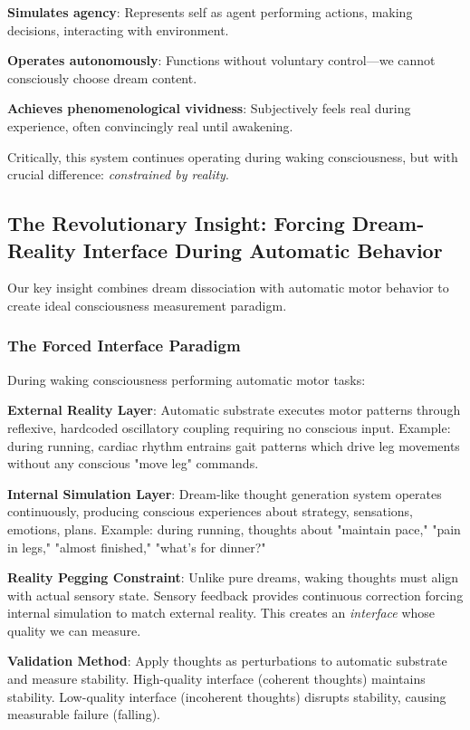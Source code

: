 \documentclass[11pt,onecolumn]{article}
\begin{document}
\textbf{Simulates agency}: Represents self as agent performing actions, making decisions, interacting with environment.

\textbf{Operates autonomously}: Functions without voluntary control---we cannot consciously choose dream content.

\textbf{Achieves phenomenological vividness}: Subjectively feels real during experience, often convincingly real until awakening.

Critically, this system continues operating during waking consciousness, but with crucial difference: \textit{constrained by reality}.

\subsection{The Revolutionary Insight: Forcing Dream-Reality Interface During Automatic Behavior}

Our key insight combines dream dissociation with automatic motor behavior to create ideal consciousness measurement paradigm.

\subsubsection{The Forced Interface Paradigm}

During waking consciousness performing automatic motor tasks:

\textbf{External Reality Layer}: Automatic substrate executes motor patterns through reflexive, hardcoded oscillatory coupling requiring no conscious input. Example: during running, cardiac rhythm entrains gait patterns which drive leg movements without any conscious "move leg" commands.

\textbf{Internal Simulation Layer}: Dream-like thought generation system operates continuously, producing conscious experiences about strategy, sensations, emotions, plans. Example: during running, thoughts about "maintain pace," "pain in legs," "almost finished," "what's for dinner?"

\textbf{Reality Pegging Constraint}: Unlike pure dreams, waking thoughts must align with actual sensory state. Sensory feedback provides continuous correction forcing internal simulation to match external reality. This creates an \textit{interface} whose quality we can measure.

\textbf{Validation Method}: Apply thoughts as perturbations to automatic substrate and measure stability. High-quality interface (coherent thoughts) maintains stability. Low-quality interface (incoherent thoughts) disrupts stability, causing measurable failure (falling).
\end{document}
